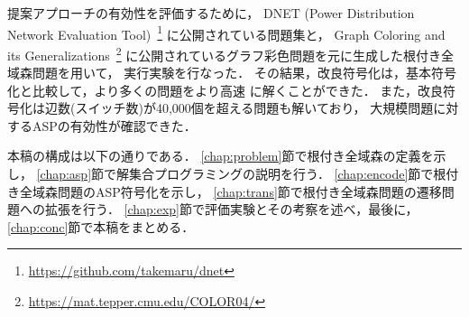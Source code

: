 提案アプローチの有効性を評価するために，
DNET (Power Distribution Network Evaluation Tool)~\footnote{%
\url{https://github.com/takemaru/dnet}}
に公開されている問題集と，
Graph Coloring and its Generalizations~\footnote{%
\url{https://mat.tepper.cmu.edu/COLOR04/}}
に公開されているグラフ彩色問題を元に生成した根付き全域森問題を用いて，
実行実験を行なった．
その結果，改良符号化は，基本符号化と比較して，より多くの問題をより高速
に解くことができた．
また，改良符号化は辺数(スイッチ数)が40,000個を超える問題も解いており，
大規模問題に対するASPの有効性が確認できた．

本稿の構成は以下の通りである．
\ref{chap:problem}節で根付き全域森の定義を示し，
\ref{chap:asp}節で解集合プログラミングの説明を行う．
\ref{chap:encode}節で根付き全域森問題のASP符号化を示し，
\ref{chap:trans}節で根付き全域森問題の遷移問題への拡張を行う．
\ref{chap:exp}節で評価実験とその考察を述べ，最後に，
\ref{chap:conc}節で本稿をまとめる．

